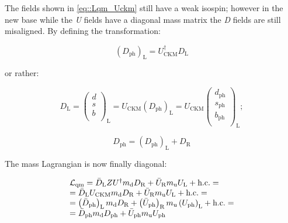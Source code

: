 The fields shown in \autoref{eq::Lqm_Uckm} still have a weak isospin; however in the new base while the \textit{U} fields have a diagonal mass matrix the \textit{D} fields are still misaligned. By defining the transformation:

\begin{equation}
\left(D_{\text{ph}}\right)_{\text{L}} = U^{\dagger}_{\text{CKM}}D_{\text{L}}
\end{equation}

or rather:

\begin{equation}
D_{\text{L}} = 
\begin{pmatrix}
d  \\
s  \\
b \\
\end{pmatrix}
_{\text{L}} =
U_{\text{CKM}}\left(D_{\text{ph}}\right)_{\text{L}} = U_{\text{CKM}}
\begin{pmatrix}
d_{\text{ph}}  \\
s_{\text{ph}}  \\
b_{\text{ph}} \\
\end{pmatrix}
_{\text{L}} ;
\end{equation}

\begin{equation}
D_{\text{ph}} = \left(D_{\text{ph}}\right)_{\text{L}} + D_{\text{R}}
\end{equation}

The mass Lagrangian is now finally diagonal:

\begin{equation}
\begin{array}{l c l}
\mathcal{L}_{\text{qm}} = \bar{D}_{\text{L}}ZU^{\dagger}m_{\text{d}}D_{\text{R}} + \bar{U}_{\text{R}}m_{\text{u}}U_{\text{L}} + \text{h.c.} = \\
= \bar{D}_{\text{L}}U_{\text{CKM}}m_{\text{d}}D_{\text{R}} + \bar{U}_{\text{R}}m_{\text{u}}U_{\text{L}} + \text{h.c.} = \\
=  \left(\bar{D}_{\text{ph}}\right)_{\text{L}}m_{\text{d}}D_{\text{R}} + \left(\bar{U}_{\text{ph}}\right)_{\text{R}}m_{\text{u}}\left(U_{\text{ph}}\right)_{\text{L}} + \text{h.c.} = \\
= \bar{D}_{\text{ph}}m_{\text{d}}D_{\text{ph}} + \bar{U}_{\text{ph}}m_{\text{u}}U_{\text{ph}}
\label{eq::Lqm_Uckm_diagonal}
\end{array}
\end{equation}

